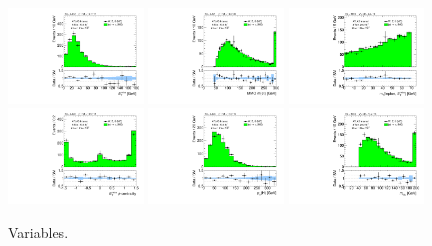 \begin{figure}[tp]
  \includegraphics[width=0.32\textwidth]{figures/analysis/vbf-MCXSR/met-pt-hi}
  \includegraphics[width=0.32\textwidth]{figures/analysis/vbf-MCXSR/mMMC}
  \includegraphics[width=0.32\textwidth]{figures/analysis/vbf-MCXSR/mT}
  \includegraphics[width=0.32\textwidth]{figures/analysis/vbf-MCXSR/met-phi-centrality}
  \includegraphics[width=0.32\textwidth]{figures/analysis/vbf-MCXSR/H-pt-hi}
  \includegraphics[width=0.32\textwidth]{figures/analysis/vbf-MCXSR/mvis}
  \caption{Variables.}
  \label{fig:backgrounds-MCXSR-taus}
\end{figure}

